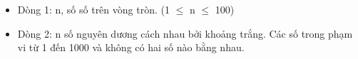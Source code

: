 \begin{itemize}
	\item     Dòng 1: n, số số trên vòng tròn. (1 $\le$ n $\le$ 100)   
	\item     Dòng 2: n số nguyên dương cách nhau bởi khoảng trắng. Các số trong phạm vi từ 1 đến 1000 và không có hai số nào bằng nhau.   
\end{itemize}
